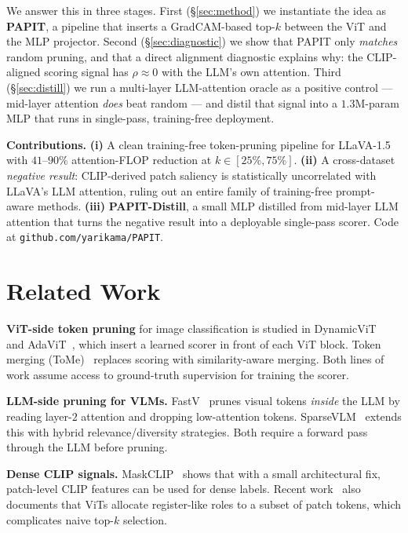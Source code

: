 \documentclass[10pt,twocolumn,letterpaper]{article}
\begin{document}
We answer this in three stages. First (\S\ref{sec:method}) we instantiate
the idea as \textbf{PAPIT}, a pipeline that inserts a GradCAM-based
top-$k$ between the ViT and the MLP projector. Second
(\S\ref{sec:diagnostic}) we show that PAPIT only \emph{matches} random
pruning, and that a direct alignment diagnostic explains why: the
CLIP-aligned scoring signal has $\rho{\approx}0$ with the LLM's own
attention. Third (\S\ref{sec:distill}) we run a multi-layer
LLM-attention oracle as a positive control --- mid-layer attention
\emph{does} beat random --- and distil that signal into a $1.3$M-param
MLP that runs in single-pass, training-free deployment.

\noindent\textbf{Contributions.}
\textbf{(i)} A clean training-free token-pruning pipeline for LLaVA-1.5
with $41$--$90\%$ attention-FLOP reduction at $k\!\in\![25\%,75\%]$.
\textbf{(ii)} A cross-dataset \emph{negative result}: CLIP-derived patch
saliency is statistically uncorrelated with LLaVA's LLM attention,
ruling out an entire family of training-free prompt-aware methods.
\textbf{(iii)} \textbf{PAPIT-Distill}, a small MLP distilled from
mid-layer LLM attention that turns the negative result into a
deployable single-pass scorer. Code at \texttt{github.com/yarikama/PAPIT}.

\section{Related Work}

\textbf{ViT-side token pruning} for image classification is studied in
DynamicViT~\cite{rao2021dynamicvit} and AdaViT~\cite{meng2022adavit},
which insert a learned scorer in front of each ViT block. Token
merging (ToMe)~\cite{bolya2023tome} replaces scoring with similarity-aware
merging. Both lines of work assume access to ground-truth supervision
for training the scorer.

\textbf{LLM-side pruning for VLMs.}
FastV~\cite{chen2024fastv} prunes visual tokens \emph{inside} the LLM by
reading layer-$2$ attention and dropping low-attention tokens.
SparseVLM~\cite{zhang2024sparsevlm} extends this with hybrid
relevance/diversity strategies. Both require a forward pass through the
LLM before pruning.

\textbf{Dense CLIP signals.}
MaskCLIP~\cite{zhou2022maskclip} shows that with a small architectural
fix, patch-level CLIP features can be used for dense labels. Recent
work~\cite{darcet2024registers} also documents that ViTs allocate
register-like roles to a subset of patch tokens, which complicates
naive top-$k$ selection.
\end{document}
